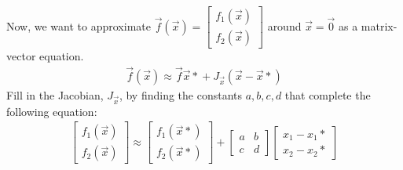\begin{enumerate}
    \qitem Now, we want to approximate $\vec{f}(\vec{x}) = \begin{bmatrix} f_1(\vec{x}) \\ f_2(\vec{x}) \end{bmatrix}$ around $\vec{x} = \vec{0}$ as a matrix-vector equation.
    \begin{align*}
        \vec{f}(\vec{x}) \approx \vec{f}{\vec{x}*} + J_{\vec{x}}(\vec{x} - \vec{x}*)
    \end{align*}
    Fill in the Jacobian, $J_{\vec{x}}$, by finding the constants $a, b, c, d$ that complete the following equation:
    \begin{align*}
        \begin{bmatrix}
            f_1(\vec{x}) \\
            f_2(\vec{x})
        \end{bmatrix} \approx
        \begin{bmatrix}
            f_1(\vec{x}*) \\
            f_2(\vec{x}*)
        \end{bmatrix} +
        \begin{bmatrix}
            a & b \\
            c & d
        \end{bmatrix} 
        \begin{bmatrix}
            x_1 - x_1* \\
            x_2 - x_2*
        \end{bmatrix}
    \end{align*}

\end{enumerate}
